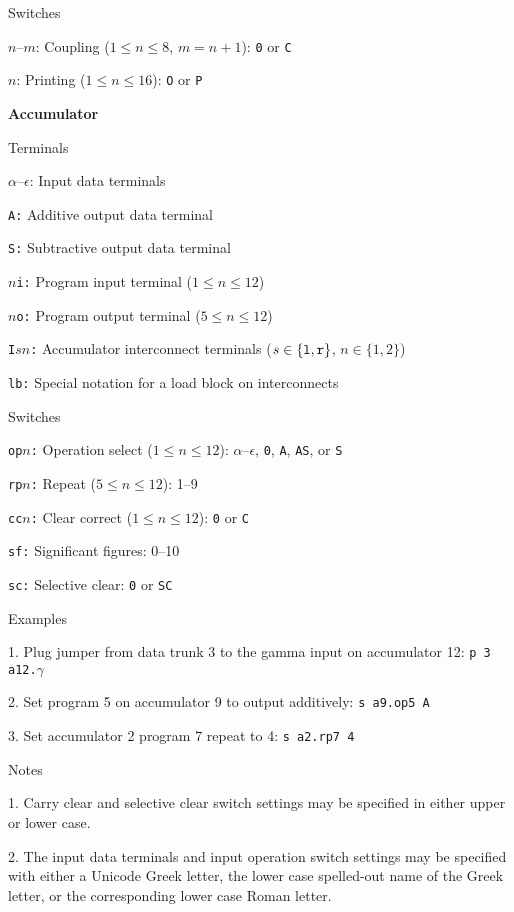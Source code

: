 Switches

{\advance\leftskip 0.75in
\item{$n$--$m$:} Coupling ($1\le n\le 8$, $m=n+1$): {\tt 0} or {\tt C}
\item{$n$:} Printing ($1\le n\le 16$): {\tt O} or {\tt P}

}

\vskip 12pt
\noindent
{\bf Accumulator}

Terminals

{\advance\leftskip 0.5in
\item{$\alpha$--$\epsilon$:} Input data terminals
\item{\tt A:} Additive output data terminal
\item{\tt S:} Subtractive output data terminal
\item{\tt $n$i:} Program input terminal ($1\le n\le 12$)
\item{\tt $n$o:} Program output terminal ($5\le n\le 12$)
\item{\tt I$sn$:} Accumulator interconnect terminals
($s\in\lbrace {\tt l, r}\rbrace$, $n\in\lbrace 1, 2\rbrace$)
\item{\tt lb:} Special notation for a load block on interconnects

}

Switches

{\advance\leftskip 0.5in
\item{\tt op$n$:} Operation select ($1\le n\le 12$): $\alpha$--$\epsilon$, {\tt 0}, {\tt A}, {\tt AS}, or {\tt S}
\item{\tt rp$n$:} Repeat ($5\le n\le 12$): 1--9
\item{\tt cc$n$:} Clear correct ($1\le n\le 12$): {\tt 0} or {\tt C}
\item{\tt sf:} Significant figures: 0--10
\item{\tt sc:} Selective clear: {\tt 0} or {\tt SC}

}

Examples

{\advance\leftskip 0.5in
\item{1.} Plug jumper from data trunk 3 to the gamma input on accumulator 12: {\tt p 3 a12.$\gamma$}
\item{2.} Set program 5 on accumulator 9 to output additively: {\tt s a9.op5 A}
\item{3.} Set accumulator 2 program 7 repeat to 4: {\tt s a2.rp7 4}

}

Notes

{\advance\leftskip 0.5in
\item{1.} Carry clear and selective clear switch settings may be specified in
either upper or lower case.
\item{2.} The input data terminals and input operation switch settings may be
specified with either  a Unicode Greek letter, the lower case spelled-out name of the Greek
letter, or the corresponding lower case Roman letter.

}

